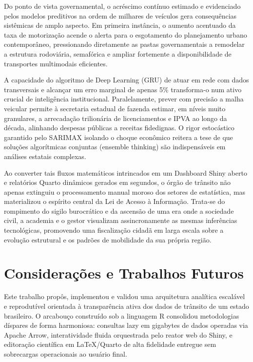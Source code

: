 \documentclass[10pt,conference]{IEEEtran}
\begin{document}
Do ponto de vista governamental, o acréscimo contínuo estimado e evidenciado pelos modelos preditivos na ordem de milhares de veículos gera consequências sistêmicas de amplo aspecto. Em primeira instância, o aumento acentuado da taxa de motorização acende o alerta para o esgotamento do planejamento urbano contemporâneo, pressionando diretamente as pastas governamentais a remodelar a estrutura rodoviária, semafórica e ampliar fortemente a disponibilidade de transportes multimodais eficientes.

A capacidade do algoritmo de Deep Learning (GRU) de atuar em rede com dados transversais e alcançar um erro marginal de apenas 5\% transforma-o num ativo crucial de inteligência institucional. Paralelamente, prever com precisão a malha veicular permite à secretaria estadual de fazenda estimar, em níveis muito granulares, a arrecadação trilionária de licenciamentos e IPVA ao longo da década, alinhando despesas públicas a receitas fidedignas. O rigor estocástico garantido pelo SARIMAX isolando o choque econômico reitera a tese de que soluções algorítmicas conjuntas (ensemble thinking) são indispensáveis em análises estatais complexas.

Ao converter tais fluxos matemáticos intrincados em um Dashboard Shiny aberto e relatórios Quarto dinâmicos gerados em segundos, o órgão de trânsito não apenas extinguiu o processamento manual moroso dos setores de estatística, mas materializou o espírito central da Lei de Acesso à Informação. Trata-se do rompimento do sigilo burocrático e da ascensão de uma era onde a sociedade civil, a academia e o gestor visualizam assincronamente as mesmas inferências tecnológicas, promovendo uma fiscalização cidadã em larga escala sobre a evolução estrutural e os padrões de mobilidade da sua própria região.


\section{Considerações e Trabalhos Futuros}
\label{sec:conclui}

Este trabalho propôs, implementou e validou uma arquitetura analítica escalável e reprodutível orientada à transparência ativa dos dados de trânsito de um estado brasileiro. O arcabouço construído sob a linguagem R consolidou metodologias díspares de forma harmoniosa: consultas lazy em gigabytes de dados operadas via Apache Arrow, interatividade fluida orquestrada pelo reator web do Shiny, e editoração científica em LaTeX/Quarto de alta fidelidade entregue sem sobrecargas operacionais ao usuário final. 
\end{document}
